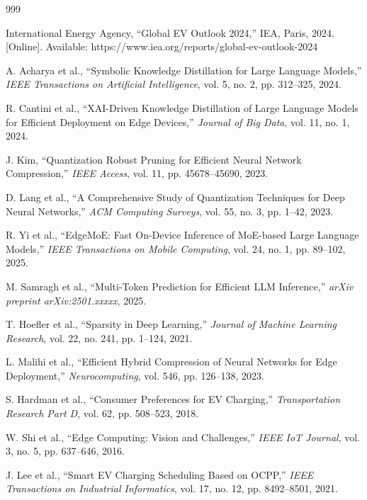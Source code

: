 \begin{thebibliography}{999}

International Energy Agency, ``Global EV Outlook 2024,'' IEA, Paris, 2024. [Online]. Available: https://www.iea.org/reports/global-ev-outlook-2024

A. Acharya et al., ``Symbolic Knowledge Distillation for Large Language Models,'' \textit{IEEE Transactions on Artificial Intelligence}, vol. 5, no. 2, pp. 312--325, 2024.

R. Cantini et al., ``XAI-Driven Knowledge Distillation of Large Language Models for Efficient Deployment on Edge Devices,'' \textit{Journal of Big Data}, vol. 11, no. 1, 2024.

J. Kim, ``Quantization Robust Pruning for Efficient Neural Network Compression,'' \textit{IEEE Access}, vol. 11, pp. 45678--45690, 2023.

D. Lang et al., ``A Comprehensive Study of Quantization Techniques for Deep Neural Networks,'' \textit{ACM Computing Surveys}, vol. 55, no. 3, pp. 1--42, 2023.

R. Yi et al., ``EdgeMoE: Fast On-Device Inference of MoE-based Large Language Models,'' \textit{IEEE Transactions on Mobile Computing}, vol. 24, no. 1, pp. 89--102, 2025.

M. Samragh et al., ``Multi-Token Prediction for Efficient LLM Inference,'' \textit{arXiv preprint arXiv:2501.xxxxx}, 2025.

T. Hoefler et al., ``Sparsity in Deep Learning,'' \textit{Journal of Machine Learning Research}, vol. 22, no. 241, pp. 1--124, 2021.

L. Malihi et al., ``Efficient Hybrid Compression of Neural Networks for Edge Deployment,'' \textit{Neurocomputing}, vol. 546, pp. 126--138, 2023.

S. Hardman et al., ``Consumer Preferences for EV Charging,'' \textit{Transportation Research Part D}, vol. 62, pp. 508--523, 2018.

W. Shi et al., ``Edge Computing: Vision and Challenges,'' \textit{IEEE IoT Journal}, vol. 3, no. 5, pp. 637--646, 2016.

J. Lee et al., ``Smart EV Charging Scheduling Based on OCPP,'' \textit{IEEE Transactions on Industrial Informatics}, vol. 17, no. 12, pp. 8492--8501, 2021.


\end{thebibliography}
